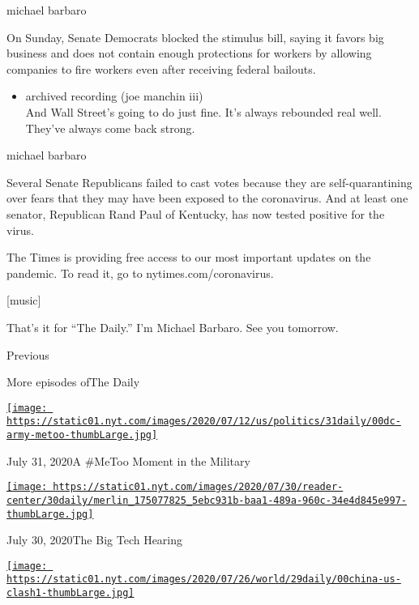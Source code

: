 michael barbaro

On Sunday, Senate Democrats blocked the stimulus bill, saying it favors
big business and does not contain enough protections for workers by
allowing companies to fire workers even after receiving federal
bailouts.

\begin{itemize}
\tightlist
\item
  archived recording (joe manchin iii)\\
  And Wall Street's going to do just fine. It's always rebounded real
  well. They've always come back strong.
\end{itemize}

michael barbaro

Several Senate Republicans failed to cast votes because they are
self-quarantining over fears that they may have been exposed to the
coronavirus. And at least one senator, Republican Rand Paul of Kentucky,
has now tested positive for the virus.

The Times is providing free access to our most important updates on the
pandemic. To read it, go to nytimes.com/coronavirus.

{[}music{]}

That's it for ``The Daily.'' I'm Michael Barbaro. See you tomorrow.

Previous

More episodes ofThe Daily

\href{https://www.nytimes.com/2020/07/31/podcasts/the-daily/vanessa-guillen-military-metoo.html?action=click\&module=audio-series-bar\&region=header\&pgtype=Article}{\texttt{[image: https://static01.nyt.com/images/2020/07/12/us/politics/31daily/00dc-army-metoo-thumbLarge.jpg]}}

July 31, 2020A \#MeToo Moment in the Military

\href{https://www.nytimes.com/2020/07/30/podcasts/the-daily/congress-facebook-amazon-google-apple.html?action=click\&module=audio-series-bar\&region=header\&pgtype=Article}{\texttt{[image: https://static01.nyt.com/images/2020/07/30/reader-center/30daily/merlin\_175077825\_5ebc931b-baa1-489a-960c-34e4d845e997-thumbLarge.jpg]}}

July 30, 2020The Big Tech Hearing

\href{https://www.nytimes.com/2020/07/29/podcasts/the-daily/china-trump-foreign-policy.html?action=click\&module=audio-series-bar\&region=header\&pgtype=Article}{\texttt{[image: https://static01.nyt.com/images/2020/07/26/world/29daily/00china-us-clash1-thumbLarge.jpg]}}

